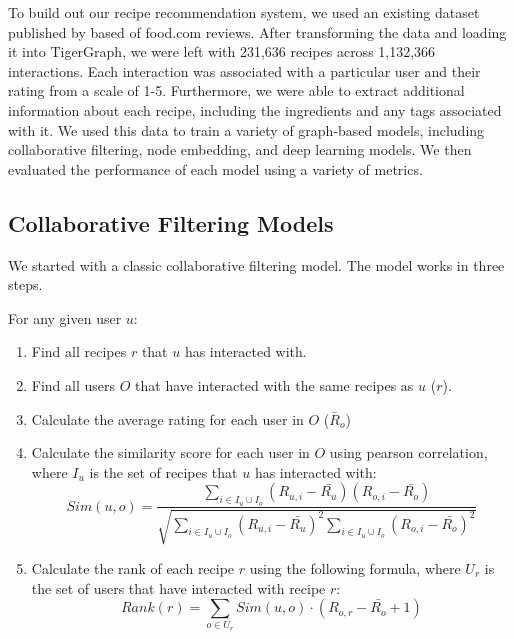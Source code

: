\documentclass{article}
\begin{document}

To build out our recipe recommendation system, we used an existing dataset published by \citet{recipegen} based of food.com reviews. After transforming the data and loading it into TigerGraph, we were left with 231,636 recipes across 1,132,366 interactions. Each interaction was associated with a particular user and their rating from a scale of 1-5. Furthermore, we were able to extract additional information about each recipe, including the ingredients and any tags associated with it. We used this data to train a variety of graph-based models, including collaborative filtering, node embedding, and deep learning models. We then evaluated the performance of each model using a variety of metrics.

\subsection{Collaborative Filtering Models}

We started with a classic collaborative filtering model. The model works in three steps.

For any given user $u$:
\begin{enumerate}
  \item Find all recipes $r$ that $u$ has interacted with.
  \item Find all users $O$ that have interacted with the same recipes as $u$ ($r$).
  \item Calculate the average rating for each user in $O$ ($\bar{R}_o$)
  \item Calculate the similarity score for each user in $O$ using pearson correlation, where $I_u$ is the set of recipes that $u$ has interacted with:
        $$
          Sim(u, o) = \frac
          {
            \sum_{i \in I_u \cup I_o} (R_{u,i} - \bar{R_u})(R_{o,i} - \bar{R_o})
          }{
            \sqrt{
              \sum_{i \in I_u \cup I_o} (R_{u,i} - \bar{R_u})^2
              \sum_{i \in I_u \cup I_o} (R_{o,i} - \bar{R_o})^2
            }
          }
        $$
  \item Calculate the rank of each recipe $r$ using the following formula, where $U_r$ is the set of users that have interacted with recipe $r$:
        $$
          Rank(r) = \sum_{o \in U_r} Sim(u, o) \cdot (R_{o, r} - \bar{R_o} + 1)
        $$
\end{enumerate}
\end{document}
